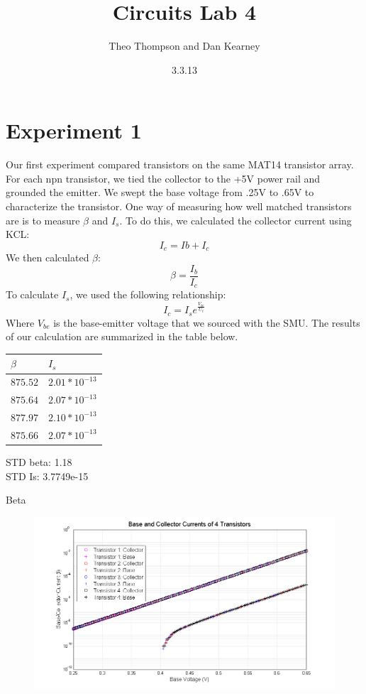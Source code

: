 \documentclass{article}
\title{Circuits Lab 4}
\author{Theo Thompson and Dan Kearney}
\date{3.3.13}
\begin{document}
\maketitle

\section*{Experiment 1}

\indent Our first experiment compared transistors on the same MAT14 transistor array. For each npn transistor, we tied the collector to the +5V power rail and grounded the emitter. We swept the base voltage from .25V to .65V to characterize the transistor. One way of measuring how well matched transistors are is to measure $\beta$ and $I_{s}$. To do this, we calculated the collector current using KCL: \[I_{e}=I{b}+I_{c}\]
We then calculated $\beta$:\[\beta=\frac{I_{b}}{I_{c}}\]
To calculate $I_{s}$, we used the following relationship: \[I_{c}=I_{s}e^{\frac{V_{be}}{U_{t}}}\]
Where $V_{be}$ is the base-emitter voltage that we sourced with the SMU. The results of our calculation are summarized in the table below.
\begin{center}
    \begin{tabular}{| l | l |} \hline
    $\beta$ & $I_{s}$ \\ \hline \hline
    $875.52$ & $2.01*10^{-13}$ \\ \hline
    $875.64$ & $2.07*10^{-13}$\\ \hline
    $877.97$ & $2.10*10^{-13}$ \\ \hline
    $875.66$ & $2.07*10^{-13}$ \\ \hline
    \end{tabular}
    STD beta: 1.18\\
    STD Is: 3.7749e-15
\end{center}

Beta 


\begin{figure}[h!]
\begin{center}
\includegraphics[scale=.6]{exp1a.png}
\caption{}
\label{fig:exp1a}
\end{center}
\end{figure}
\end{document}
